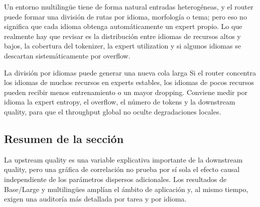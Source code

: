 Un entorno multilingüe tiene de forma natural entradas heterogéneas, y el router puede formar una división de rutas por idioma, morfología o tema; pero eso no significa que cada idioma obtenga automáticamente un expert propio. Lo que realmente hay que revisar es la distribución entre idiomas de recursos altos y bajos, la cobertura del tokenizer, la expert utilization y si algunos idiomas se descartan sistemáticamente por overflow.



\begin{warningbox}{La división por idiomas puede generar una nueva cola larga}
Si el router concentra los idiomas de muchos recursos en experts estables, los idiomas de pocos recursos pueden recibir menos entrenamiento o un mayor dropping. Conviene medir por idioma la expert entropy, el overflow, el número de tokens y la downstream quality, para que el throughput global no oculte degradaciones locales.
\end{warningbox}

\subsection{Resumen de la sección}

La upstream quality es una variable explicativa importante de la downstream quality, pero una gráfica de correlación no prueba por sí sola el efecto causal independiente de los parámetros dispersos adicionales. Los resultados de Base/Large y multilingües amplían el ámbito de aplicación y, al mismo tiempo, exigen una auditoría más detallada por tarea y por idioma.
